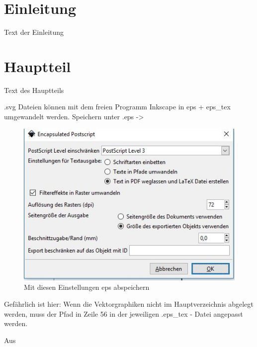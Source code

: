 \documentclass[a4paper, 12pt]{article}
\begin{document}


\setcounter{page}{1}

\section{Einleitung} \label{einleitung}

Text der Einleitung

\section{Hauptteil}

Text des Hauptteils

\begin{figure}[htb]
\def\svgwidth{0.5\textwidth}
\fontsize{11}{8}\selectfont

\end{figure}

.svg Dateien können mit dem freien Programm Inkscape in eps + eps\_tex umgewandelt werden. Speichern unter .eps -> 

\begin{figure}[H]
\includegraphics[width=\textwidth]{images/screenshot.jpg}
\caption{Mit diesen Einstellungen eps abspeichern}
\end{figure}

Gefährlich ist hier: Wenn die Vektorgraphiken nicht im Hauptverzeichnis abgelegt werden, muss der Pfad in Zeile 56 in der jeweiligen .eps\_tex - Datei angepasst werden.

Aus
\end{document}
